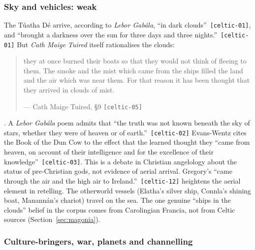 \documentclass[11pt,a4paper]{article}
\newcommand{\pid}[1]{\texttt{\small #1}}
\begin{document}
\subsubsection{Sky and vehicles: weak}

The Túatha Dé arrive, according to \emph{Lebor Gabála}, \enquote{in dark clouds}~\pid{[celtic-01]}, and \enquote{brought a darkness over the sun for three days and three nights.}~\pid{[celtic-01]} But \emph{Cath Maige Tuired} itself rationalises the clouds: 
\begin{quote}\small they at once burned their boats so that they would not think of fleeing to them. The smoke and the mist which came from the ships filled the land and the air which was near them. For that reason it has been thought that they arrived in clouds of mist.\par\hfill{\footnotesize --- Cath Maige Tuired, §9 \pid{[celtic-05]}}\end{quote}
 \parencite{gray1982cmt}. A \emph{Lebor Gabála} poem admits that \enquote{the truth was not known beneath the sky of stars, whether they were of heaven or of earth.}~\pid{[celtic-02]} Evans-Wentz cites the Book of the Dun Cow to the effect that the learned thought they \enquote{came from heaven, on account of their intelligence and for the excellence of their knowledge}~\pid{[celtic-03]}. This is a debate in Christian angelology about the status of pre-Christian gods, not evidence of aerial arrival. Gregory's \enquote{came through the air and the high air to Ireland.}~\pid{[celtic-12]} heightens the aerial element in retelling. The otherworld vessels (Elatha's silver ship, Connla's shining boat, Manannán's chariot) travel on the sea. The one genuine ``ships in the clouds'' belief in the corpus comes from Carolingian Francia, not from Celtic sources (Section~\ref{sec:magonia}).

\subsubsection{Culture-bringers, war, planets and channelling}
\end{document}

